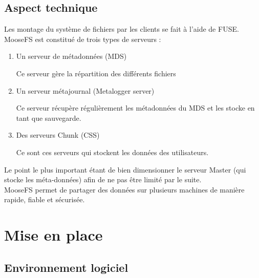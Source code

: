 \documentclass[12pt]{report}
\begin{document}
			\subsection{Aspect technique}
				
Les montage du système de fichiers par les clients se fait à l'aide de FUSE. MooseFS est constitué de trois types de serveurs :

				\begin{enumerate}
					\item Un serveur de métadonnées (MDS)

					Ce serveur gère la répartition des différents fichiers
					\item Un serveur métajournal (Metalogger server)

					Ce serveur récupère régulièrement les métadonnées du MDS et les stocke en tant que sauvegarde.
					\item Des serveurs Chunk (CSS) %

					Ce sont ces serveurs qui stockent les données des utilisateurs.
				\end{enumerate}
				
				Le point le plus important étant de bien dimensionner le serveur Master (qui stocke les méta-données)
				afin de ne pas être limité par le suite.\\

				MooseFS permet de partager des données sur plusieurs machines de manière rapide, fiable et sécurisée.

		\section{Mise en place}
			\subsection{Environnement logiciel}
\end{document}
